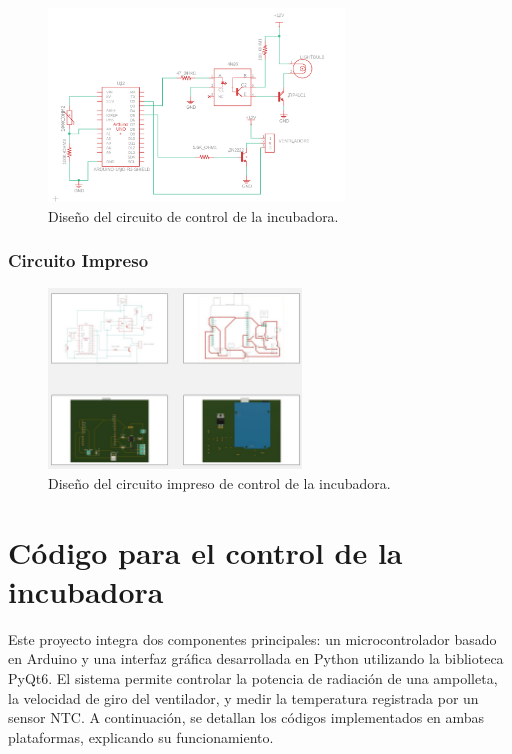 \documentclass[spanish, a4paper, 11pt]{article}
\begin{document}
\begin{figure}[ht]
    \centering
    \includegraphics[width=0.7\textwidth]{./figures/Circuito.png}
    \caption{Diseño del circuito de control de la incubadora.}
\end{figure}
\FloatBarrier

\subsubsection{Circuito Impreso}

\begin{figure}[ht]
    \centering
    \includegraphics[width=0.6\textwidth]{./figures/PCB.png}
    \caption{Diseño del circuito impreso de control de la incubadora.}
\end{figure}
\FloatBarrier

\section{Código para el control de la incubadora}

Este proyecto integra dos componentes principales: un microcontrolador basado en Arduino y una interfaz gráfica desarrollada en Python utilizando la biblioteca PyQt6. El sistema permite controlar la potencia de radiación de una ampolleta, la velocidad de giro del ventilador, y medir la temperatura registrada por un sensor NTC. A continuación, se detallan los códigos implementados en ambas plataformas, explicando su funcionamiento.
\end{document}

